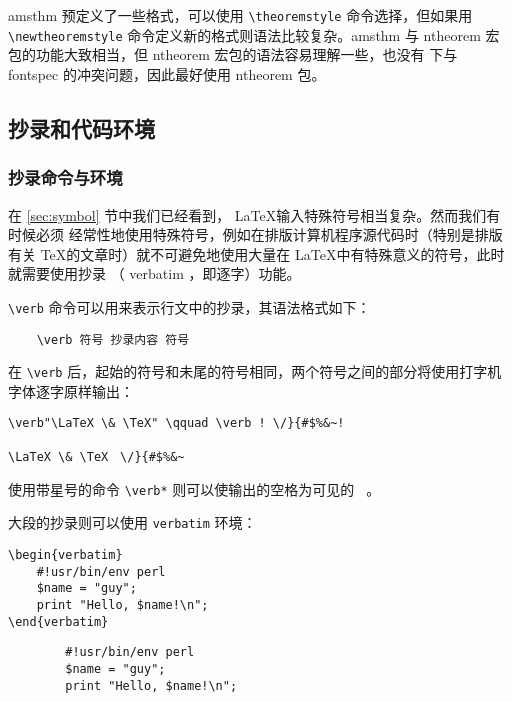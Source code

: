 amsthm 预定义了一些格式，可以使用 \verb|\theoremstyle| 命令选择，但如果用
\verb|\newtheoremstyle| 命令定义新的格式则语法比较复杂。amsthm 与 ntheorem 宏包的功能大致相当，但 ntheorem 宏包的语法容易理解一些，也没有 \XeTeX 下与 fontspec 的冲突问题，因此最好使用 ntheorem 包。

\subsection{抄录和代码环境}

\subsubsection{抄录命令与环境}

在 \ref{sec:symbol} 节中我们已经看到， \LaTeX 输入特殊符号相当复杂。然而我们有时候必须
经常性地使用特殊符号，例如在排版计算机程序源代码时（特别是排版有关 \TeX 的文章时）就不可避免地使用大量在 \LaTeX 中有特殊意义的符号，此时就需要使用抄录 （ verbatim ，即逐字）功能。

\verb|\verb| 命令可以用来表示行文中的抄录，其语法格式如下：
\begin{lstlisting}
    \verb 符号 抄录内容 符号
\end{lstlisting}

在 \verb |\verb| 后，起始的符号和未尾的符号相同，两个符号之间的部分将使用打字机字体逐字原样输出：

\begin{minipage}[t]{0.45\textwidth}
\begin{lstlisting}
\verb"\LaTeX \& \TeX" \qquad \verb ! \/}{#$%&~!
\end{lstlisting}
\end{minipage}
\hfill
\begin{minipage}[t]{0.45\textwidth}
\verb"\LaTeX \& \TeX" \qquad \verb ! \/}{#$%
\end{minipage}

使用带星号的命令 \verb|\verb*| 则可以使输出的空格为可见的 \verb*| |。

大段的抄录则可以使用 \verb|verbatim| 环境：

\begin{minipage}[t]{0.45\textwidth}
\begin{lstlisting}
\begin{verbatim}
    #!usr/bin/env perl
    $name = "guy";
    print "Hello, $name!\n";
\end{verbatim}
\end{lstlisting}
\end{minipage}
\hfill
\begin{minipage}[t]{0.45\textwidth}
    \begin{verbatim}
        #!usr/bin/env perl
        $name = "guy";
        print "Hello, $name!\n";
    \end{verbatim}
\end{minipage}


